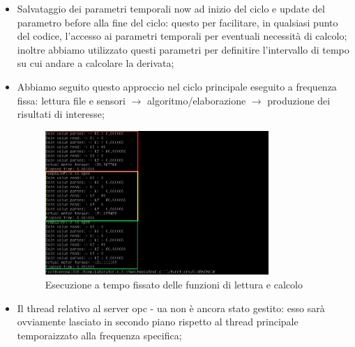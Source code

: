 \begin{itemize}
\begin{itemize}
\begin{figure}[H]
			\label{fig:xenomai_nano}
		\end{figure}
		\item Salvataggio dei parametri temporali now ad inizio del ciclo e update del parametro before alla fine del ciclo: questo per facilitare, in qualsiasi punto del codice, l'accesso ai parametri temporali per eventuali necessità di calcolo; inoltre abbiamo utilizzato questi parametri per definitire l'intervallo di tempo su cui andare a calcolare la derivata;
		\item Abbiamo seguito questo approccio nel ciclo principale eseguito a frequenza fissa: lettura file e sensori $\rightarrow$ algoritmo/elaborazione $\rightarrow$ produzione dei risultati di interesse;
		\begin{figure}[H]
			\centering   	
			\includegraphics[width=0.8\textwidth]{Immagini/xenomai_execution.png}
			\caption{Esecuzione a tempo fissato delle funzioni di lettura e calcolo}
			\label{fig:xenomai_execution}
		\end{figure}
		\item Il thread relativo al server opc - ua non è ancora stato gestito: esso sarà ovviamente lasciato in secondo piano rispetto al thread principale temporaizzato alla frequenza specifica;
	\end{itemize}
\end{itemize}
